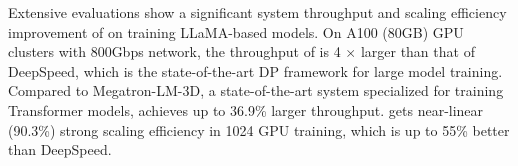       
        






Extensive evaluations show a significant system throughput and scaling efficiency improvement of \SysName on training LLaMA-based models. On A100 (80GB) GPU clusters with 800Gbps network, the throughput of \SysName is 4 $\times$ larger than that of DeepSpeed, which is the state-of-the-art DP framework for large model training. Compared to Megatron-LM-3D, a state-of-the-art system specialized for training Transformer models, \SysName achieves up to 36.9\% larger throughput. \SysName gets near-linear (90.3\%) strong scaling efficiency in 1024 GPU training, which is up to 55\% better than DeepSpeed. 


